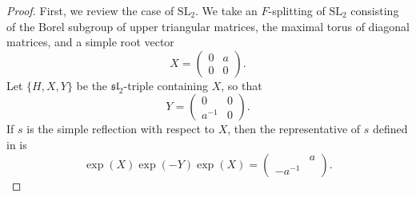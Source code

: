 \documentclass[11pt]{amsart}
\numberwithin{equation}{section}
\theoremstyle{plain}
\theoremstyle{definition}
\theoremstyle{remark}
\def\SL{\mathrm{SL}}
\begin{document}
\begin{proof}
First, we review the case of $\SL_2$.
We take an $F$-splitting of $\SL_2$ consisting of the Borel subgroup of upper triangular matrices, the maximal torus of diagonal matrices, and a simple root vector
\[
 X = \begin{pmatrix} 0 & a \\ 0 & 0 \end{pmatrix}.
\]
Let $\{ H, X, Y \}$ be the $\mathfrak{sl}_2$-triple containing $X$, so that
\[
 Y = \begin{pmatrix} 0 & 0 \\ a^{-1} & 0 \end{pmatrix}.
\]
If $s$ is the simple reflection with respect to $X$, then the representative of $s$ defined in \cite[\S 2.1]{ls} is
\[
 \exp(X) \exp(-Y) \exp(X) = \begin{pmatrix} & a \\ -a^{-1} & \end{pmatrix}.
\]


\end{proof}
\end{document}
